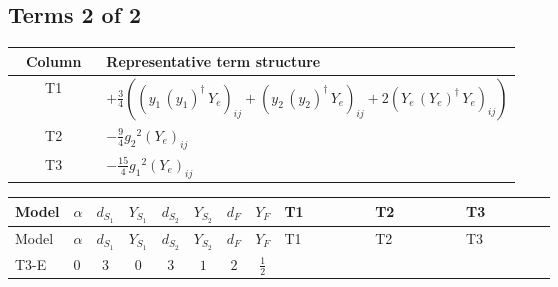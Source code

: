 \documentclass[8pt]{article}
\begin{document}
\begin{landscape}
\subsection*{Terms 2 of 2}
\begin{center}
\begin{tabular}{@{}c >{\raggedright\arraybackslash}p{0.82\linewidth}@{}}
\toprule
Column & Representative term structure \\
\midrule
T1 & \(\displaystyle +\frac{3}{4} (\left({y_1}\,\left({y_1}\right)^{\dagger}\,{Y_e}\right)_{ij}+\left({y_2}\,\left({y_2}\right)^{\dagger}\,{Y_e}\right)_{ij}+2 \left({Y_e}\,\left({Y_e}\right)^{\dagger}\,{Y_e}\right)_{ij})\) \\
\midrule
T2 & \(\displaystyle -\frac{9}{4} {g_2}^2 \left({Y_e}\right)_{ij}\) \\
\midrule
T3 & \(\displaystyle -\frac{15}{4} {g_1}^2 \left({Y_e}\right)_{ij}\) \\
\midrule
\bottomrule
\end{tabular}
\end{center}
\smallskip
\tiny
\begin{longtable}{@{}llcccccc >{\raggedright\arraybackslash}p{0.21\linewidth} >{\raggedright\arraybackslash}p{0.21\linewidth} >{\raggedright\arraybackslash}p{0.21\linewidth}@{}}
\toprule
Model & $\alpha$ & $d_{S_1}$ & $Y_{S_1}$ & $d_{S_2}$ & $Y_{S_2}$ & $d_F$ & $Y_F$ & T1 & T2 & T3 \\
\midrule
\endfirsthead
\toprule
Model & $\alpha$ & $d_{S_1}$ & $Y_{S_1}$ & $d_{S_2}$ & $Y_{S_2}$ & $d_F$ & $Y_F$ & T1 & T2 & T3 \\
\midrule
\endhead
T3-E & $0$ & $3$ & $0$ & $3$ & $1$ & $2$ & $\frac{1}{2}$ & \scriptsize\adjustbox{max width=\linewidth}{$\begin{gathered} +\frac{3}{4} (\left({y_1}\,\left({y_1}\right)^{\dagger}\,{Y_e}\right)_{ij}+\left({y_2}\,\left({y_2}\right)^{\dagger}\,{Y_e}\right)_{ij}+2 \left({Y_e}\,\left({Y_e}\right)^{\dagger}\,{Y_e}\right)_{ij})\end{gathered}$} & \scriptsize\adjustbox{max width=\linewidth}{$\begin{gathered} -\frac{9}{4} {g_2}^2 \left({Y_e}\right)_{ij}\end{gathered}$} & \scriptsize\adjustbox{max width=\linewidth}{$\begin{gathered} -\frac{15}{4} {g_1}^2 \left({Y_e}\right)_{ij}\end{gathered}$} \\
\midrule
\bottomrule
\end{longtable}
\clearpage

\end{landscape}
\end{document}

